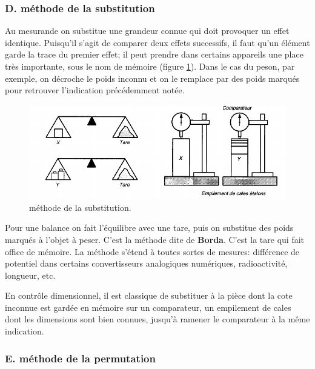 \subsubsection{D. méthode de la substitution}

Au mesurande on substitue une grandeur connue qui doit provoquer un effet identique. Puisqu'il s'agit de comparer deux effets successifs, il faut qu'un élément garde la trace du premier effet; il peut prendre dans certains appareils une place très importante, sous le nom de mémoire (figure \ref{fig:metsub}). Dans le cas du peson, par exemple, on décroche le poids inconnu et on le remplace par des poids marqués pour retrouver l'indication précédemment notée.
\begin{figure}[h]
    \centering
    \includegraphics[width=15cm]{assets/figures/metsub.pdf}
    \caption{méthode de la substitution.}
    \label{fig:metsub}
\end{figure}

Pour une balance on fait l'équilibre avec une tare, puis on substitue des poids marqués à l'objet à peser. C'est la méthode dite de \textbf{Borda}. C'est la tare qui fait office de mémoire. La méthode s'étend à toutes sortes de mesures: différence de potentiel dans certains convertisseurs analogiques numériques, radioactivité, longueur, etc.

En contrôle dimensionnel, il est classique de substituer à la pièce dont la cote inconnue est gardée en mémoire sur un comparateur, un empilement de cales dont les dimensions sont bien connues, jusqu'à ramener le comparateur à la même indication.

\subsubsection{E. méthode de la permutation}

